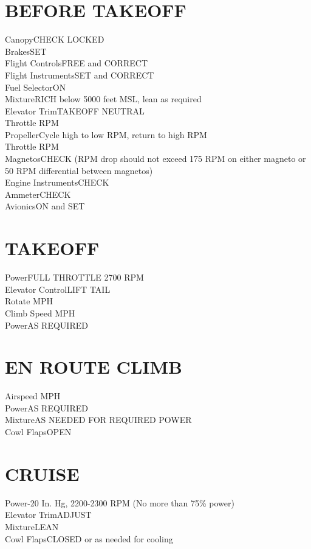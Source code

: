 \documentclass{article}
\begin{document}
\begin{multicols*}{2}
\section*{BEFORE TAKEOFF}
Canopy\dotfill CHECK LOCKED\\
Brakes\dotfill SET\\
Flight Controls\dotfill FREE and CORRECT\\
Flight Instruments\dotfill SET and CORRECT\\
Fuel Selector\dotfill ON\\
Mixture\dotfill RICH below 5000 feet MSL, lean as required\\
Elevator Trim\dotfill TAKEOFF NEUTRAL\\
Throttle RPM\\
Propeller\dotfill Cycle high to low RPM, return to high RPM\\
Throttle RPM\\
Magnetos\dotfill CHECK (RPM drop should not exceed 175 RPM on either magneto or 50 RPM differential between magnetos)\\
Engine Instruments\dotfill CHECK\\
Ammeter\dotfill CHECK\\
Avionics\dotfill ON and SET
\section*{TAKEOFF}
Power\dotfill FULL THROTTLE 2700 RPM\\
Elevator Control\dotfill LIFT TAIL\\
Rotate MPH\\
Climb Speed MPH\\
Power\dotfill AS REQUIRED
\section*{EN ROUTE CLIMB}
Airspeed MPH\\
Power\dotfill AS REQUIRED\\
Mixture\dotfill AS NEEDED FOR REQUIRED POWER\\
Cowl Flaps\dotfill OPEN
\section*{CRUISE}
Power-20 In. Hg, 2200-2300 RPM (No more than 75\% power)\\
Elevator Trim\dotfill ADJUST\\
Mixture\dotfill LEAN\\
Cowl Flaps\dotfill CLOSED or as needed for cooling

\end{multicols*}
\end{document}
